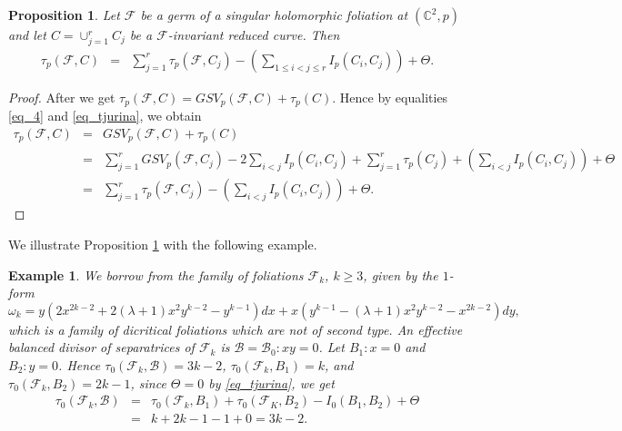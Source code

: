 \documentclass[11pt]{amsart}
\newcommand{\C}{\mathbb{C}}
\newcommand{\F}{\mathcal{F}}
\newcommand{\B}{\mathcal{B}}
\newtheorem{example}[theorem]{Example}
\newtheorem{proposition}[theorem]{Proposition}
\begin{document}
\begin{proposition}\label{prop_tju}
Let $\F$ be a germ of a singular holomorphic foliation at $(\C^2,p)$ and let $C=\cup_{j=1}^{r}C_j$ be a $\F$-invariant reduced curve. Then
\begin{eqnarray*}
\tau_p(\mathcal{F},C)&=& \sum^{r}_{j=1}\tau_p(\mathcal{F},C_j)-\left(\sum_{1\leq i<j\leq r} I_p(C_i,C_j)\right)+\Theta.
\end{eqnarray*}
\end{proposition}
\begin{proof} After \cite[Proposition 6.2]{FP-GB-SM2021} we get $\tau_p(\mathcal{F},C)= GSV_p(\mathcal{F},C)+ \tau_p(C)$. Hence by equalities \eqref{eq_4} and \eqref{eq_tjurina}, we obtain
\begin{eqnarray*}
\tau_p(\mathcal{F},C)&=& GSV_p(\mathcal{F},C)+ \tau_p(C)\\
&=& \sum^{r}_{j=1}GSV_p(\mathcal{F},C_j)-2\sum_{i<j} I_p(C_i,C_j)+\sum^{r}_{j=1}\tau_p(C_j)+\left(\sum_{i<j} I_p(C_i,C_j)\right)+\Theta\\
&=& \sum^{r}_{j=1}\tau_p(\mathcal{F},C_j)-\left(\sum_{i<j} I_p(C_i,C_j)\right)+\Theta.
\end{eqnarray*}
\end{proof}

We illustrate Proposition \ref{prop_tju} with the following example.
\begin{example}\label{eje1}
We borrow from \cite[Example 6.5]{FP-GB-SM2021} the family of foliations $\F_k$, $k\geq 3$,  given by the $1$-form 
\[\omega_k=y\left(2x^{2k-2}+2(\lambda+1)x^2y^{k-2}-y^{k-1}\right)dx+x\left(y^{k-1}-(\lambda+1)x^2y^{k-2}-x^{2k-2}\right)dy,\]
which is a family of dicritical foliations which are not of second type. An effective  balanced divisor of separatrices of $\F_k$ is $\mathcal B=\mathcal B_0: xy=0$. Let $B_1:x=0$ and $B_2:y=0$. Hence $\tau_0(\F_k, \B)=3k-2$, $\tau_0(\F_k, B_1)=k$, and $\tau_0(\F_k,B_2)=2k-1$, since $\Theta=0$ by \eqref{eq_tjurina}, we get
\[\begin{array}{lll}
\tau_0(\mathcal{F}_k,\B) &=& \tau_0(\mathcal{F}_k,B_1)+ \tau_0(\mathcal{F}_K,B_2) - I_0(B_1,B_2)+\Theta\\
&=& k+2k-1-1+0=3k-2.
\end{array}
\]
\end{example}
\end{document}

